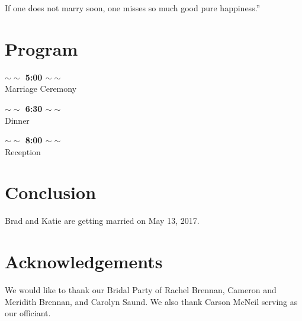 \documentclass[letterpaper, 11 pt, conference]{ieeeconf}
\newcommand{\programSpace}{\vspace{0.2in}}
\newcommand{\programTime}[1]{\textbf{$\sim\sim$ #1 $\sim\sim$}}
\begin{document}
If one does not marry soon, one misses so much good pure happiness.''\cite{Darwin}


\vspace{1.5in}

\section{Program}
\programSpace
\begin{center}
  \programTime{5:00}\\
  Marriage Ceremony\\
  \programSpace

  \programTime{6:30}\\
  Dinner\\
  \programSpace

  \programTime{8:00}\\
  Reception

  \programSpace
  
\end{center}
\section{Conclusion}
Brad and Katie are getting married on May 13, 2017.

\section{Acknowledgements}
We would like to thank our Bridal Party of Rachel Brennan, Cameron and Meridith Brennan, and Carolyn Saund.
We also thank Carson McNeil serving as our officiant.



\end{document}
